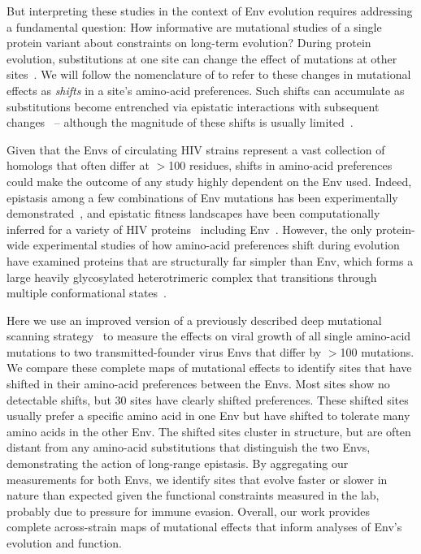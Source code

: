 \documentclass[9pt]{elife}
\begin{document}
But interpreting these studies in the context of Env evolution requires addressing a fundamental question: How informative are mutational studies of a single protein variant about constraints on long-term evolution?
During protein evolution, substitutions at one site can change the effect of mutations at other sites~\citep{natarajan2013epistasis,gong2013stability,harms2014historical,podgornaia2015pervasive,starr2016epistasis,klink2017parallel}.
We will follow the nomenclature of \citet{pollock2012amino} to refer to these changes in mutational effects as \emph{shifts} in a site's amino-acid preferences.
Such shifts can accumulate as substitutions become entrenched via epistatic interactions with subsequent changes~\citep{starr2017pervasive,pollock2012amino,shah2015contingency,bazykin2015changing} -- although the magnitude of these shifts is usually limited~\citep{doud2015site,chan2017correlation,ashenberg2013mutational,risso2014mutational}.

Given that the Envs of circulating HIV strains represent a vast collection of homologs that often differ at $>$100 residues, shifts in amino-acid preferences could make the outcome of any study highly dependent on the Env used.
Indeed, epistasis among a few combinations of Env mutations has been experimentally demonstrated~\citep{da2010fitness}, and epistatic fitness landscapes have been computationally inferred for a variety of HIV proteins~\citep{kouyos2012exploring,ferguson2013translating,mann2014fitness,barton2015scaling} including Env~\citep{louie2018fitness}. 
However, the only protein-wide experimental studies of how amino-acid preferences shift during evolution have examined proteins that are structurally far simpler than Env, which forms a large heavily glycosylated heterotrimeric complex that transitions through multiple conformational states~\citep{munro2014conformational,ozorowski2017open}.

Here we use an improved version of a previously described deep mutational scanning strategy~\citep{haddox2016experimental} to measure the effects on viral growth of all single amino-acid mutations to two transmitted-founder virus Envs that differ by $>$100 mutations.
We compare these complete maps of mutational effects to identify sites that have shifted in their amino-acid preferences between the Envs.
Most sites show no detectable shifts, but 30 sites have clearly shifted preferences.
These shifted sites usually prefer a specific amino acid in one Env but have shifted to tolerate many amino acids in the other Env.
The shifted sites cluster in structure, but are often distant from any amino-acid substitutions that distinguish the two Envs, demonstrating the action of long-range epistasis.
By aggregating our measurements for both Envs, we identify sites that evolve faster or slower in nature than expected given the functional constraints measured in the lab, probably due to pressure for immune evasion.
Overall, our work provides complete across-strain maps of mutational effects that inform analyses of Env's evolution and function.
\end{document}
